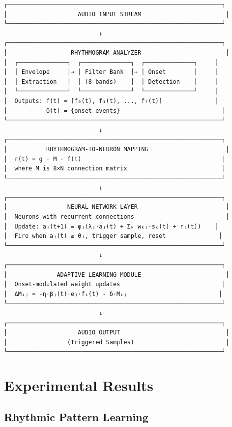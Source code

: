 \documentclass[11pt,a4paper]{article}
\begin{document}
\begin{verbatim}
┌─────────────────────────────────────────────────────────────┐
│                    AUDIO INPUT STREAM                        │
└─────────────────────────────────────────────────────────────┘
                           ↓
┌─────────────────────────────────────────────────────────────┐
│                  RHYTHMOGRAM ANALYZER                        │
│  ┌──────────────┐  ┌──────────────┐  ┌──────────────┐     │
│  │ Envelope     │→ │ Filter Bank  │→ │ Onset        │     │
│  │ Extraction   │  │ (8 bands)    │  │ Detection    │     │
│  └──────────────┘  └──────────────┘  └──────────────┘     │
│  Outputs: f(t) = [f₀(t), f₁(t), ..., f₇(t)]               │
│           O(t) = {onset events}                             │
└─────────────────────────────────────────────────────────────┘
                           ↓
┌─────────────────────────────────────────────────────────────┐
│           RHYTHMOGRAM-TO-NEURON MAPPING                      │
│  r(t) = g · M · f(t)                                        │
│  where M is 8×N connection matrix                           │
└─────────────────────────────────────────────────────────────┘
                           ↓
┌─────────────────────────────────────────────────────────────┐
│                 NEURAL NETWORK LAYER                         │
│  Neurons with recurrent connections                          │
│  Update: aⱼ(t+1) = φⱼ(λⱼ·aⱼ(t) + Σₖ wₖⱼ·sₖ(t) + rⱼ(t))    │
│  Fire when aⱼ(t) ≥ θⱼ, trigger sample, reset               │
└─────────────────────────────────────────────────────────────┘
                           ↓
┌─────────────────────────────────────────────────────────────┐
│              ADAPTIVE LEARNING MODULE                        │
│  Onset-modulated weight updates                             │
│  ΔMᵢⱼ = -η·βⱼ(t)·eⱼ·fᵢ(t) - δ·Mᵢⱼ                          │
└─────────────────────────────────────────────────────────────┘
                           ↓
┌─────────────────────────────────────────────────────────────┐
│                    AUDIO OUTPUT                              │
│                 (Triggered Samples)                          │
└─────────────────────────────────────────────────────────────┘
\end{verbatim}

\section{Experimental Results}

\subsection{Rhythmic Pattern Learning}
\end{document}
